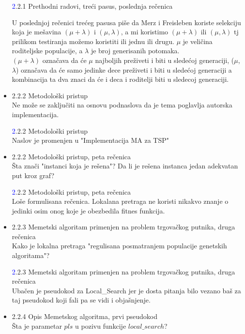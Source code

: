 \documentclass[a4paper]{report}
\newcommand{\odgovor}[1]{\textcolor{blue}{#1}}
\begin{document}
\begin{itemize}
  \odgovor 2.2.1 Prethodni radovi, treći pasus, poslednja rečenica
  
      U poslednjoj rečenici trećeg pasusa piše da Merz i Freisleben koriste selekciju koja je mešavina  $(\mu +\lambda)$ i $(\mu,\lambda)$, a mi koristimo $(\mu +\lambda)$ ili $(\mu,\lambda)$ tj prilikom testiranja možemo koristiti ili jednu ili drugu.
     $\mu$ je veličina roditeljske populacije, a $\lambda$ je broj generisanih potomaka.\\
     $(\mu +\lambda)$ označava da će $\mu$ najboljih preživeti i biti u sledećoj generaciji, ($\mu$, $\lambda$) označava da će samo jedinke dece preživeti i biti u sledećoj generaciji a kombinacija ta dva znaci da će i deca i roditelji biti u sledecoj generaciji.
        
        
        
        
    \item 2.2.2 Metodološki pristup \\
    Ne može se zaključiti na osnovu podnaslova da je tema poglavlja autorska implementacija.
    
    \odgovor 2.2.2 Metodološki pristup \\
    Naslov je promenjen u "Implementacija MA za TSP"
    
    \item 2.2.2 Metodološki pristup, peta rečenica \\
    Šta znači "instanci koja je rešena"? Da li je rešena instanca jedan adekvatan put kroz graf?
  
    \odgovor 2.2.2 Metodološki pristup, peta rečenica \\
    Loše formulisana rečenica.
    Lokalana pretraga ne koristi nikakvo znanje o jedinki osim onog koje je obezbedila fitnes funkcija.
    
    \item 2.2.3 Memetski algoritam primenjen na problem trgovačkog putnika, druga rečenica \\
    Kako je lokalna pretraga "regulisana posmatranjem populacije genetskih algoritama"?
    
    \odgovor 2.2.3 Memetski algoritam primenjen na problem trgovačkog putnika, druga rečenica \\
    Ubačen je pseudokod za Local\_Search jer je dosta pitanja bilo vezano baš za taj pseudokod koji fali pa se vidi i objašnjenje.
    
    \item 2.2.4 Opis Memetskog algoritma, prvi pseudokod \\
    Šta je parametar $pls$ u pozivu funkcije $local\_search$?


\end{itemize}
\end{document}

